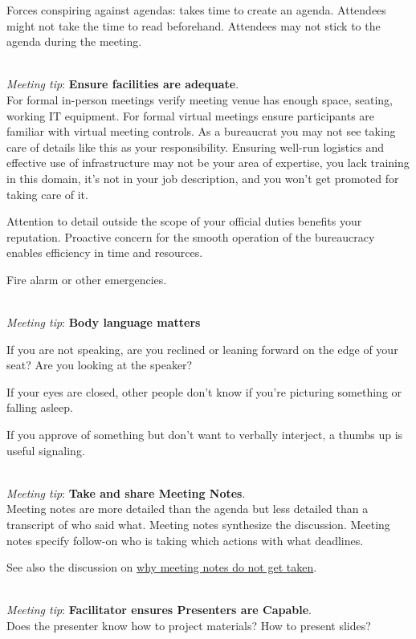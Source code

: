 Forces conspiring against agendas: takes time to create an agenda. Attendees might not take the time to read beforehand. Attendees may not stick to the agenda during the meeting.

\ \\
\textit{Meeting tip}: \textbf{Ensure facilities are adequate}.\\
For formal in-person meetings verify meeting venue has enough space, seating, working IT equipment. For formal virtual meetings ensure participants are familiar with virtual meeting controls. 
As a bureaucrat you may not see taking care of details like this as your responsibility. Ensuring well-run logistics and effective use of infrastructure may not be your area of expertise, you lack training in this domain, it's not in your job description, and you won't get promoted for taking care of it. 

Attention to detail outside the scope of your official duties benefits your reputation. Proactive concern for the smooth operation of the bureaucracy enables efficiency in time and resources.


Fire alarm or other emergencies. 

\ \\
\textit{Meeting tip}: \textbf{Body language matters}

If you are not speaking, are you reclined or leaning forward on the edge of your seat? Are you looking at the speaker?

If your eyes are closed, other people don't know if you're picturing something or falling asleep. 

If you approve of something but don't want to verbally interject, a thumbs up is useful signaling. 

\ \\
\textit{Meeting tip}: \textbf{Take and share Meeting Notes}.\\
Meeting notes are more detailed than the agenda but less detailed than a transcript of who said what. Meeting notes synthesize the discussion. Meeting notes specify follow-on who is taking which actions with what deadlines. 

See also the discussion on \hyperref[sec:written-comm-does-not-happen]{why meeting notes do not get taken}.

\ \\
\textit{Meeting tip}: \textbf{Facilitator ensures Presenters are Capable}.\\
Does the presenter know how to project materials? How to present slides?

